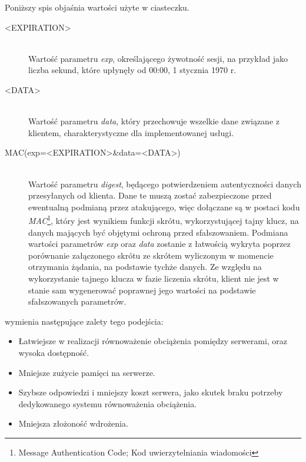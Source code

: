 \documentclass[11pt]{aghdpl}
\begin{document}
Poniższy spis objaśnia wartości użyte w ciasteczku.
\begin{description}
\item[<EXPIRATION>] \hfill \\
Wartość parametru \emph{exp}, określającego żywotność sesji, na przykład jako liczba sekund, które upłynęły od 00:00, 1 stycznia 1970 r.
\item[<DATA>] \hfill \\
Wartość parametru \emph{data}, który przechowuje wszelkie dane związane z klientem, charakterystyczne dla implementowanej usługi.
\item[MAC(exp=<EXPIRATION>\&data=<DATA>)] \hfill \\
Wartość parametru \emph{digest}, będącego potwierdzeniem autentyczności danych przesyłanych od klienta. Dane te muszą zostać zabezpieczone przed ewentualną podmianą przez atakującego, więc dołączane są w postaci kodu \emph{MAC}\footnote{Message Authentication Code; Kod uwierzytelniania wiadomości}, który jest wynikiem funkcji skrótu, wykorzystującej tajny klucz, na danych mających być objętymi ochroną przed sfałszowaniem. Podmiana wartości parametrów \emph{exp} oraz \emph{data} zostanie z łatwością wykryta poprzez porównanie załączonego skrótu ze skrótem wyliczonym w momencie otrzymania żądania, na podstawie tychże danych. Ze względu na wykorzystanie tajnego klucza w fazie liczenia skrótu, klient nie jest w stanie sam wygenerować poprawnej jego wartości na podstawie sfałszowanych parametrów.
\end{description}

\cite{SeMa08} wymienia następujące zalety tego podejścia:
\begin{itemize}
\item Łatwiejsze w realizacji równoważenie obciążenia pomiędzy serwerami, oraz wysoka dostępność.
\item Mniejsze zużycie pamięci na serwerze.
\item Szybsze odpowiedzi i mniejszy koszt serwera, jako skutek braku potrzeby dedykowanego systemu równoważenia obciążenia.
\item Mniejsza złożoność wdrożenia.
\end{itemize}
\end{document}
